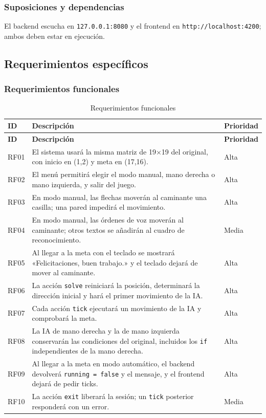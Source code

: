 \documentclass[12pt,a4paper]{article}
\begin{document}
\subsubsection{Suposiciones y dependencias}
El backend escucha en \texttt{127.0.0.1:8080} y el frontend en
\texttt{http://localhost:4200}; ambos deben estar en ejecución.

\subsection{Requerimientos específicos}

\subsubsection{Requerimientos funcionales}
\begin{longtable}{p{1.3cm}p{9.2cm}p{2.6cm}}
\caption{Requerimientos funcionales}\\
\toprule
\textbf{ID} & \textbf{Descripción} & \textbf{Prioridad}\\
\midrule\endfirsthead
\toprule
\textbf{ID} & \textbf{Descripción} & \textbf{Prioridad}\\
\midrule\endhead
RF01 & El sistema usará la misma matriz de 19$\times$19 del original, con inicio en (1,2) y meta en (17,16). & Alta\\
RF02 & El menú permitirá elegir el modo manual, mano derecha o mano izquierda, y salir del juego. & Alta\\
RF03 & En modo manual, las flechas moverán al caminante una casilla; una pared impedirá el movimiento. & Alta\\
RF04 & En modo manual, las órdenes de voz moverán al caminante; otros textos se añadirán al cuadro de reconocimiento. & Media\\
RF05 & Al llegar a la meta con el teclado se mostrará «Felicitaciones, buen trabajo.» y el teclado dejará de mover al caminante. & Alta\\
RF06 & La acción \texttt{solve} reiniciará la posición, determinará la dirección inicial y hará el primer movimiento de la IA. & Alta\\
RF07 & Cada acción \texttt{tick} ejecutará un movimiento de la IA y comprobará la meta. & Alta\\
RF08 & La IA de mano derecha y la de mano izquierda conservarán las condiciones del original, incluidos los \texttt{if} independientes de la mano derecha. & Alta\\
RF09 & Al llegar a la meta en modo automático, el backend devolverá \texttt{running = false} y el mensaje, y el frontend dejará de pedir ticks. & Alta\\
RF10 & La acción \texttt{exit} liberará la sesión; un \texttt{tick} posterior responderá con un error. & Media\\
\bottomrule
\end{longtable}
\end{document}
